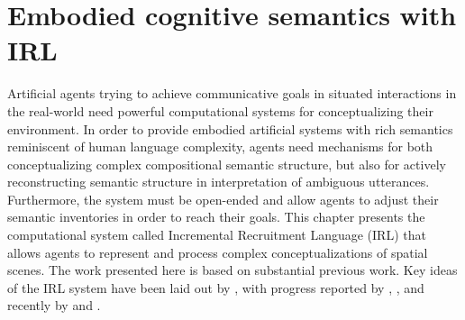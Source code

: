 %

\chapter{Embodied cognitive semantics with IRL}
\label{s:irl}
Artificial agents trying to achieve communicative goals in situated interactions
in the real-world need powerful computational systems for conceptualizing 
their environment. In order to provide 
embodied artificial systems with rich semantics reminiscent of human 
language complexity, agents need mechanisms for both conceptualizing complex 
compositional semantic structure, but also for 
actively reconstructing semantic 
structure in interpretation of ambiguous utterances.
Furthermore, the system must be open-ended and 
allow agents to adjust their semantic inventories in order to reach their goals. 
This chapter presents the computational system called
Incremental Recruitment Language (IRL) 
that allows agents to represent and process complex conceptualizations
of spatial scenes. The work presented here is based on substantial previous work. 
Key ideas of the IRL system have been laid out by \cite{steels2000emergence}, 
with progress reported by \cite{steels2005planning}, \cite{vandenbroeck2008irl}, and
recently by \citet{spranger2010irl} and \citet{spranger2012irl}.

